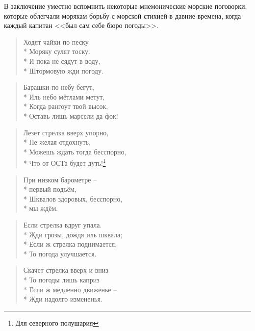 В заключение уместно вспомнить некоторые мнемонические морские
поговорки, которые облегчали морякам борьбу с морской стихией в давние
времена, когда каждый капитан <<был сам себе бюро погоды>>.

\small

\begin{quote}
Ходят чайки по песку \\*
Моряку сулят тоску. \\*
И пока не сядут в воду, \\*
Штормовую жди погоду.
\end{quote}

\begin{quote}
Барашки по небу бегут, \\*
Иль небо мётлами метут, \\*
Когда рангоут твой высок, \\*
Оставь лишь марсели да фок!
\end{quote}

\begin{quote}
Лезет стрелка вверх упорно, \\*
Не желая отдохнуть, \\*
Можешь ждать тогда бесспорно, \\*
Что от ОСТа будет дуть!\footnote{Для северного полушария}
\end{quote}

\begin{quote}
  При низком барометре \--- \\*
  первый подъём, \\*
  Шквалов здоровых, бесспорно, \\*
  мы ждём.
\end{quote}

\begin{quote}
Если стрелка вдруг упала. \\*
Жди грозы, дождя иль шквала; \\*
Если ж стрелка поднимается, \\*
То погода улучшается.
\end{quote}

\begin{quote}
Скачет стрелка вверх и вниз \\*
То погоды лишь каприз \\*
Если ж медленно движенье \--- \\*
Жди надолго измененья.
\end{quote}

